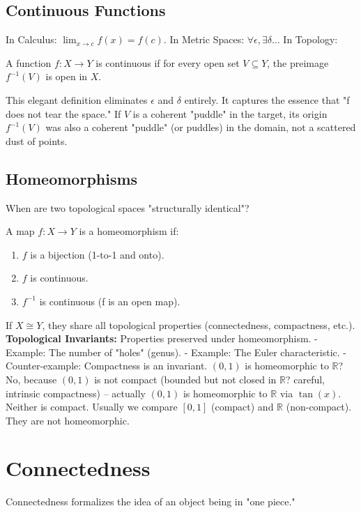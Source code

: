 \documentclass[oneside]{book}
\begin{document}
\subsection{Continuous Functions}
In Calculus: $\lim_{x\to c} f(x) = f(c)$.
In Metric Spaces: $\forall \epsilon, \exists \delta \dots$
In Topology:
\begin{definition}
A function $f: X \to Y$ is continuous if for every open set $V \subseteq Y$, the preimage $f^{-1}(V)$ is open in $X$.
\end{definition}
This elegant definition eliminates $\epsilon$ and $\delta$ entirely. It captures the essence that "f does not tear the space." If $V$ is a coherent "puddle" in the target, its origin $f^{-1}(V)$ was also a coherent "puddle" (or puddles) in the domain, not a scattered dust of points.

\subsection{Homeomorphisms}
When are two topological spaces "structurally identical"?
\begin{definition}[Homeomorphism]
A map $f: X \to Y$ is a homeomorphism if:
\begin{enumerate}
    \item $f$ is a bijection (1-to-1 and onto).
    \item $f$ is continuous.
    \item $f^{-1}$ is continuous (f is an open map).
\end{enumerate}
\end{definition}
If $X \cong Y$, they share all topological properties (connectedness, compactness, etc.).
\textbf{Topological Invariants:} Properties preserved under homeomorphism.
- Example: The number of "holes" (genus).
- Example: The Euler characteristic.
- Counter-example: Compactness is an invariant. $(0, 1)$ is homeomorphic to $\mathbb{R}$? No, because $(0, 1)$ is not compact (bounded but not closed in $\mathbb{R}$? careful, intrinsic compactness) -- actually $(0, 1)$ is homeomorphic to $\mathbb{R}$ via $\tan(x)$. Neither is compact. Usually we compare $[0, 1]$ (compact) and $\mathbb{R}$ (non-compact). They are not homeomorphic.

\section{Connectedness}

Connectedness formalizes the idea of an object being in "one piece."
\end{document}
